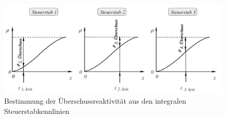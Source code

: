 		\begin{figure}[ht]
							\centering
							\captionsetup{justification=centering}
							\includegraphics[scale=0.3]{pic/ueberschuss}
							\caption{Bestimmung der Überschussreaktivität aus den integralen Steuerstabkennlinien\cite{stab}}
							\label{int:ueberschuss}
		\end{figure}
	